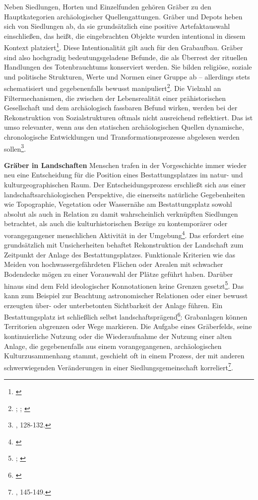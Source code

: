 \documentclass[openany,twoside,twocolumn]{book}
\let\rmarkdownfootnote\footnote%
\def\footnote{\protect\rmarkdownfootnote}
\begin{document}
Neben Siedlungen, Horten und Einzelfunden gehören Gräber zu den Hauptkategorien archäologischer Quellengattungen. Gräber und Depots heben sich von Siedlungen ab, da sie grundsätzlich eine positive Artefaktauswahl einschließen, das heißt, die eingebrachten Objekte wurden intentional in diesem Kontext platziert\footnote{\textcite{eggers_einfuhrung_1959}}. Diese Intentionalität gilt auch für den Grabaufbau. Gräber sind also hochgradig bedeutungsgeladene Befunde, die als Überrest der rituellen Handlungen des Totenbrauchtums konserviert werden. Sie bilden religiöse, soziale und politische Strukturen, Werte und Normen einer Gruppe ab -- allerdings stets schematisiert und gegebenenfalls bewusst manipuliert\footnote{\textcite{harke_final_1997}; \textcite{humphreys_comparative_1981}; \textcite{palgi_death_1984}}. Die Vielzahl an Filtermechanismen, die zwischen der Lebensrealität einer prähistorischen Gesellschaft und dem archäologisch fassbaren Befund wirken, werden bei der Rekonstruktion von Sozialstrukturen oftmals nicht ausreichend reflektiert. Das ist umso relevanter, wenn aus den statischen archäologischen Quellen dynamische, chronologische Entwicklungen und Transformationsprozesse abgelesen werden sollen\footnote{\textcite{hofmann_rituelle_2008}, 128-132.}.

\textbf{Gräber in Landschaften} \newline 
Menschen trafen in der Vorgeschichte immer wieder neu eine Entscheidung für die Position eines Bestattungsplatzes im natur- und kulturgeographischen Raum. Der Entscheidungsprozess erschließt sich aus einer landschaftsarchäologischen Perspektive, die einerseits natürliche Gegebenheiten wie Topographie, Vegetation oder Wassernähe am Bestattungsplatz sowohl absolut als auch in Relation zu damit wahrscheinlich verknüpften Siedlungen betrachtet, als auch die kulturhistorischen Bezüge zu kontemporärer oder vorangegangener menschlichen Aktivität in der Umgebung\footnote{\textcite{balee_historical_1998}}. Das erfordert eine grundsätzlich mit Unsicherheiten behaftet Rekonstruktion der Landschaft zum Zeitpunkt der Anlage des Bestattungsplatzes. Funktionale Kriterien wie das Meiden von hochwassergefährdeten Flächen oder Arealen mit schwacher Bodendecke mögen zu einer Vorauswahl der Plätze geführt haben. Darüber hinaus sind dem Feld ideologischer Konnotationen keine Grenzen gesetzt\footnote{\textcite{artelius_bronze_1998}; \textcite{stjernquist_introduction_1992-1}}. Das kann zum Beispiel zur Beachtung astronomischer Relationen oder einer bewusst erzeugten über- oder unterbetonten Sichtbarkeit der Anlage führen. Ein Bestattungsplatz ist schließlich selbst landschaftsprägend\footnote{\textcite{enninger_friedhofe_1989}}: Grabanlagen können Territorien abgrenzen oder Wege markieren. Die Aufgabe eines Gräberfelds, seine kontinuierliche Nutzung oder die Wiederaufnahme der Nutzung einer alten Anlage, die gegebenenfalls aus einem vorangegangenen, archäologischen Kulturzusammenhang stammt, geschieht oft in einem Prozess, der mit anderen schwerwiegenden Veränderungen in einer Siedlungsgemeinschaft korreliert\footnote{\textcite{hofmann_rituelle_2008}, 145-149.}.
\end{document}
